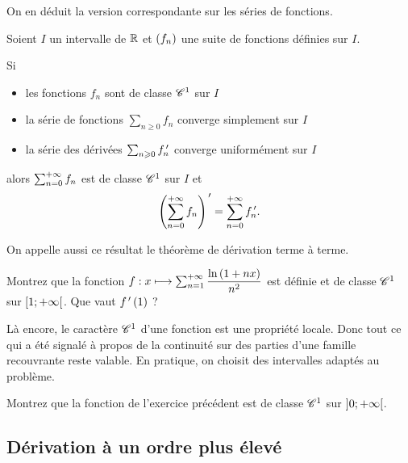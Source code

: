 On en déduit la version correspondante sur les séries de fonctions.

\begin{cor}
Soient \(I\) un intervalle de \(\mathbb{R}\) et \(\left(f_n\right)\) une suite de fonctions définies sur \(I\).

Si

\begin{itemize}
    \item les fonctions \(f_n\) sont de classe \(\mathscr{C}^{1}\) sur \(I\) \\
    \item la série de fonctions \(\sum_{n\geq0}f_n\) converge simplement sur \(I\) \\
    \item la série des dérivées \(\sum_{n\geqslant0}f_n^{\,\prime}\) converge uniformément sur \(I\)
\end{itemize}

alors \(\sum_{n=0}^{+\infty}f_n\) est de classe \(\mathscr{C}^{1}\) sur \(I\) et \[\left(\sum_{n=0}^{+\infty}f_n\right)^{\,\prime}=\sum_{n=0}^{+\infty}f_n^{\,\prime}.\]
\end{cor}

On appelle aussi ce résultat le théorème de dérivation terme à terme.

\begin{exo}
Montrez que la fonction \(f:x\longmapsto\sum_{n=1}^{+\infty}\dfrac{\ln\left(1+nx\right)}{n^2}\) est définie et de classe \(\mathscr{C}^{1}\) sur \(\left[1;+\infty\right[\). Que vaut \(f^{\,\prime}\left(1\right)\) ?
\end{exo}

\begin{rem}
Là encore, le caractère \(\mathscr{C}^{1}\) d'une fonction est une propriété locale. Donc tout ce qui a été signalé à propos de la continuité sur des parties d'une famille recouvrante reste valable. En pratique, on choisit des intervalles adaptés au problème.
\end{rem}

\begin{exo}
Montrez que la fonction de l'exercice précédent est de classe \(\mathscr{C}^{1}\) sur \(\left]0;+\infty\right[\).
\end{exo}

\subsection{Dérivation à un ordre plus élevé}

